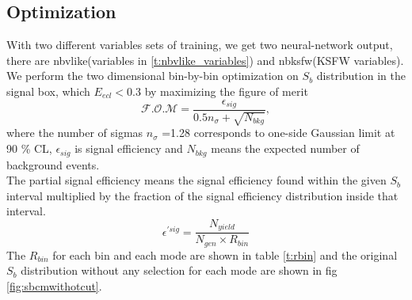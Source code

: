 \subsection{Optimization}
With two different variables sets of training, we get two neural-network output, there are nbvlike(variables in \ref{t:nbvlike_variables}) and nbksfw(KSFW variables). We perform the two dimensional bin-by-bin optimization on $S_b$ distribution in the signal box, which $E_{ecl} < 0.3$ by maximizing the figure of merit\cite{ref:Punzi2003}
\begin{equation}
\label{eq:fom}
\mathcal{F.O.M} = \frac{\epsilon_{sig}}{0.5 n_{\sigma}+\sqrt{N_{bkg}}},
\end{equation}
where the number of sigmas $n_\sigma$ =1.28 corresponds to one-side Gaussian limit at 90 \% CL, $\epsilon_{sig}$ is signal efficiency and $N_{bkg}$ means the expected number of background events.\\
The partial signal efficiency means the signal efficiency found within the given $S_b$ interval multiplied by the fraction of the signal efficiency distribution inside that interval.
\begin{equation}
\label{eq:peff}
\epsilon^{'sig} = \frac{N_{yield}}{N_{gen} \times R_{bin} } 
\end{equation}
The $R_{bin}$ for each bin and each mode are shown in table \ref{t:rbin} and the original $S_b$ distribution without any selection for each mode are shown in fig \ref{fig:sbcmwithotcut}. 

